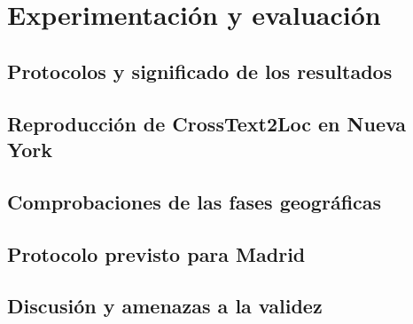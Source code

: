 \chapter{Experimentación y evaluación}
\label{cap:evaluacion}

\section{Protocolos y significado de los resultados}
\label{sec:protocolos}

\section{Reproducción de CrossText2Loc en Nueva York}
\label{sec:evaluacion-ny}

\section{Comprobaciones de las fases geográficas}
\label{sec:comprobaciones}

\section{Protocolo previsto para Madrid}
\label{sec:protocolo-madrid}

\section{Discusión y amenazas a la validez}
\label{sec:amenazas}
